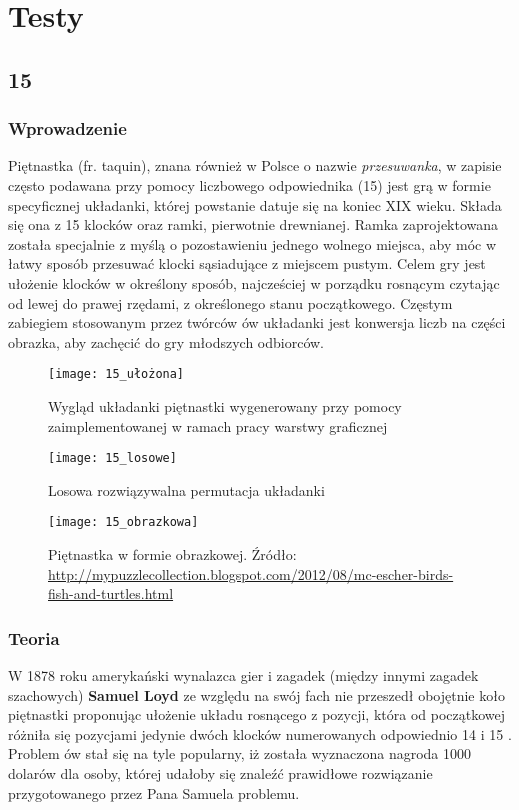 \chapter{Testy}
\thispagestyle{chapterBeginStyle}

\section{15}
    \subsection{Wprowadzenie}
        Piętnastka (fr. taquin), znana również w Polsce o nazwie \textit{przesuwanka}, w zapisie często podawana przy pomocy liczbowego
        odpowiednika (15) jest grą w formie specyficznej
        układanki, której powstanie datuje się na koniec XIX wieku. Składa się ona z 
        15 klocków oraz ramki, pierwotnie drewnianej. Ramka zaprojektowana została specjalnie z myślą
        o pozostawieniu jednego wolnego miejsca, aby móc w łatwy sposób przesuwać klocki sąsiadujące z miejscem 
        pustym. Celem gry jest ułożenie klocków w określony sposób, najcześciej w porządku rosnącym czytając 
        od lewej do prawej rzędami, z określonego stanu początkowego. Częstym zabiegiem stosowanym przez 
        twórców ów układanki jest konwersja liczb na części obrazka, aby zachęcić do gry młodszych odbiorców.

        \begin{figure}[H]
            \texttt{[image: 15\_ułożona]}
            \centering
            \caption{Wygląd układanki piętnastki wygenerowany przy pomocy zaimplementowanej w ramach pracy warstwy graficznej}
        \end{figure}

        \begin{figure}[H]
            \texttt{[image: 15\_losowe]}
            \centering
            \caption{Losowa rozwiązywalna permutacja układanki}
        \end{figure}

        \begin{figure}[H]
            \texttt{[image: 15\_obrazkowa]}
            \centering
            \caption{Piętnastka w formie obrazkowej. Źródło: \url{http://mypuzzlecollection.blogspot.com/2012/08/mc-escher-birds-fish-and-turtles.html}}
        \end{figure}

    \subsection{Teoria}
        W 1878 roku amerykański wynalazca gier i zagadek (między innymi zagadek szachowych) \textbf{Samuel Loyd} ze względu na swój fach 
        nie przeszedł obojętnie koło piętnastki proponując ułożenie układu rosnącego z pozycji, która 
        od początkowej różniła się pozycjami jedynie dwóch klocków numerowanych odpowiednio 14 i 15 \cite{FifteenLoydProblem}.
        Problem ów stał się na tyle popularny, iż została wyznaczona nagroda 1000 dolarów dla osoby, której udałoby się 
        znaleźć prawidłowe rozwiązanie przygotowanego przez Pana Samuela problemu.

